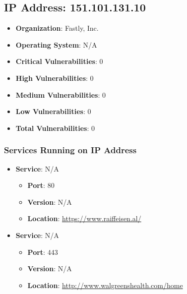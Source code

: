 \documentclass{article}
\begin{document}
\clearpage



\subsection*{IP Address: 151.101.131.10}

\begin{itemize}
    \item \textbf{Organization}: Fastly, Inc.
    \item \textbf{Operating System}:  N/A 
    \item \textbf{Critical Vulnerabilities}: 0
    \item \textbf{High Vulnerabilities}: 0
    \item \textbf{Medium Vulnerabilities}: 0
    \item \textbf{Low Vulnerabilities}: 0
    \item \textbf{Total Vulnerabilities}: 0
\end{itemize}

\subsubsection*{Services Running on IP Address}

\begin{itemize}
    
        \item \textbf{Service}: N/A
        \begin{itemize}
            \item \textbf{Port}: 80
            \item \textbf{Version}:  N/A 
            \item \textbf{Location}: \href{ https://www.raiffeisen.al/ }{ https://www.raiffeisen.al/ }
        \end{itemize}
    
        \item \textbf{Service}: N/A
        \begin{itemize}
            \item \textbf{Port}: 443
            \item \textbf{Version}:  N/A 
            \item \textbf{Location}: \href{ http://www.walgreenshealth.com/home }{ http://www.walgreenshealth.com/home }
        \end{itemize}
    
\end{itemize}
\end{document}
